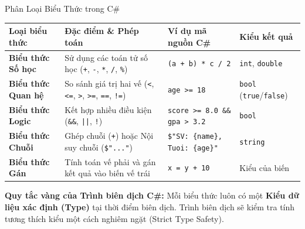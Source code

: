\documentclass[aspectratio=169, 10pt]{beamer}
\begin{document}
\begin{frame}[fragile]{Phân Loại Biểu Thức trong C\#}
  \begin{table}[h]
    \centering
    \small
    \begin{tabularx}{\textwidth}{l p{4.2cm} p{3.8cm} l}
      \toprule
      \textbf{Loại biểu thức} & \textbf{Đặc điểm \& Phép toán} & \textbf{Ví dụ mã nguồn C\#} & \textbf{Kiểu kết quả} \\
      \midrule
      \textbf{Biểu thức Số học} & Sử dụng các toán tử số học (\texttt{+}, \texttt{-}, \texttt{*}, \texttt{/}, \texttt{\%}) & \texttt{(a + b) * c / 2} & \texttt{int}, \texttt{double} \\
      \addlinespace
      \textbf{Biểu thức Quan hệ} & So sánh giá trị hai vế (\texttt{<}, \texttt{<=}, \texttt{>}, \texttt{>=}, \texttt{==}, \texttt{!=}) & \texttt{age >= 18} & \texttt{bool} (\texttt{true}/\texttt{false}) \\
      \addlinespace
      \textbf{Biểu thức Logic} & Kết hợp nhiều điều kiện (\texttt{\&\&}, \texttt{||}, \texttt{!}) & \texttt{score >= 8.0 \&\& gpa > 3.2} & \texttt{bool} \\
      \addlinespace
      \textbf{Biểu thức Chuỗi} & Ghép chuỗi (\texttt{+}) hoặc Nội suy chuỗi (\texttt{\$"..."}) & \texttt{\$"SV: \{name\}, Tuoi: \{age\}"} & \texttt{string} \\
      \addlinespace
      \textbf{Biểu thức Gán} & Tính toán vế phải và gán kết quả vào biến vế trái & \texttt{x = y + 10} & Kiểu của biến \\
      \bottomrule
    \end{tabularx}
  \end{table}

  \begin{exampleblock}{\textbf{Quy tắc vàng của Trình biên dịch C\#:}}
    Mỗi biểu thức luôn có một \textbf{Kiểu dữ liệu xác định (Type)} tại thời điểm biên dịch. Trình biên dịch sẽ kiểm tra tính tương thích kiểu một cách nghiêm ngặt (Strict Type Safety).
  \end{exampleblock}
\end{frame}
\end{document}

